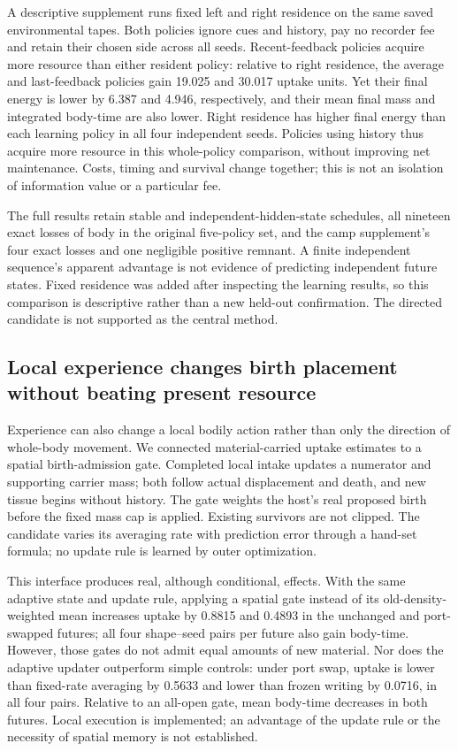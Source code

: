 A descriptive supplement runs fixed left and right residence on the same saved environmental tapes. Both policies ignore cues and history, pay no recorder fee and retain their chosen side across all seeds. Recent-feedback policies acquire more resource than either resident policy: relative to right residence, the average and last-feedback policies gain 19.025 and 30.017 uptake units. Yet their final energy is lower by 6.387 and 4.946, respectively, and their mean final mass and integrated body-time are also lower. Right residence has higher final energy than each learning policy in all four independent seeds. Policies using history thus acquire more resource in this whole-policy comparison, without improving net maintenance. Costs, timing and survival change together; this is not an isolation of information value or a particular fee.

The full results retain stable and independent-hidden-state schedules, all nineteen exact losses of body in the original five-policy set, and the camp supplement's four exact losses and one negligible positive remnant. A finite independent sequence's apparent advantage is not evidence of predicting independent future states. Fixed residence was added after inspecting the learning results, so this comparison is descriptive rather than a new held-out confirmation. The directed candidate is not supported as the central method.

\subsection*{Local experience changes birth placement without beating present resource}
Experience can also change a local bodily action rather than only the direction of whole-body movement. We connected material-carried uptake estimates to a spatial birth-admission gate. Completed local intake updates a numerator and supporting carrier mass; both follow actual displacement and death, and new tissue begins without history. The gate weights the host's real proposed birth before the fixed mass cap is applied. Existing survivors are not clipped. The candidate varies its averaging rate with prediction error through a hand-set formula; no update rule is learned by outer optimization.

This interface produces real, although conditional, effects. With the same adaptive state and update rule, applying a spatial gate instead of its old-density-weighted mean increases uptake by 0.8815 and 0.4893 in the unchanged and port-swapped futures; all four shape--seed pairs per future also gain body-time. However, those gates do not admit equal amounts of new material. Nor does the adaptive updater outperform simple controls: under port swap, uptake is lower than fixed-rate averaging by 0.5633 and lower than frozen writing by 0.0716, in all four pairs. Relative to an all-open gate, mean body-time decreases in both futures. Local execution is implemented; an advantage of the update rule or the necessity of spatial memory is not established.

